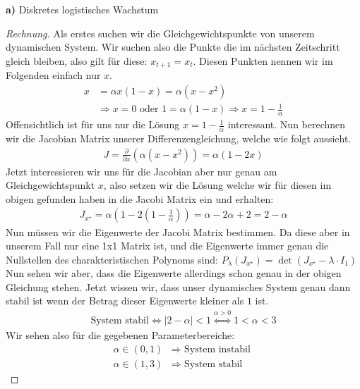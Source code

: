 \documentclass[a4paper]{article}
\newenvironment{Aufgabe}[2][Aufgabe]{\begin{trivlist}
\item[\hskip \labelsep {\bfseries #1}\hskip \labelsep {\bfseries #2.}]}{\end{trivlist}}
\begin{document}
	\begin{theorem} %
	\begin{Aufgabe}{20} %
		\textbf{a)} 
		Diskretes logistisches Wachstum
	\end{Aufgabe}

	\begin{proof}[Rechnung]
		Als erstes suchen wir die Gleichgewichtspunkte von unserem dynamischen System.
		Wir suchen also die Punkte die im nächsten Zeitschritt gleich bleiben, also gilt für diese:
		$x_{t+1} = x_{t}$. Diesen Punkten nennen wir im Folgenden einfach nur $x$.
		\begin{align*}
			x &= \alpha x (1 - x)
			= \alpha \left(
				x - x ^2
			\right) \\
			  & \Rightarrow x = 0 \text{ oder } 1 = \alpha ( 1 - x )
			  \Rightarrow x = 1 - \frac{ 1 }{ \alpha }
		\end{align*}
		Offensichtlich ist für uns nur die Lösung $x = 1 - \frac{ 1 }{ \alpha }$ interessant.
		Nun berechnen wir die Jacobian Matrix unserer Differenzengleichung, welche wie folgt aussieht.
		\begin{align*}
			J = \frac{ \partial  }{ \partial x } \left(
				\alpha (x - x ^2)
			\right) = \alpha \left(
				1 - 2 x
			\right) 
		\end{align*}
		Jetzt interessieren wir uns für die Jacobian aber nur genau am Gleichgewichtspunkt $x$, also setzen wir
		die Lösung welche wir für diesen im obigen gefunden haben in die Jacobi Matrix ein und erhalten:
		\begin{align*}
			J_{x ^{\star}} = \alpha \left(
				1 - 2 \left(
					1 - \frac{ 1 }{ \alpha }
				\right) 
			\right) = \alpha - 2 \alpha + 2 = 2 - \alpha
		\end{align*}
		Nun müssen wir die Eigenwerte der Jacobi Matrix bestimmen. Da diese aber in unserem Fall nur eine 1x1 Matrix
		ist, und die Eigenwerte immer genau die Nullstellen des charakteristischen Polynoms sind:
		$P_\lambda (J_{x ^{\star}}) = \det (J_{x ^{\star}} - \lambda \cdot I_1)$
		Nun sehen wir aber, dass die Eigenwerte allerdings schon genau in der obigen Gleichung stehen.
		Jetzt wissen wir, dass unser dynamisches System genau dann stabil ist wenn der Betrag dieser Eigenwerte
		kleiner als $1$ ist.
		\begin{align*}
			\text{System stabil} \Leftrightarrow
			| 2 - \alpha | < 1
			\overset{\alpha > 0} \Longleftrightarrow 1 < \alpha < 3
		\end{align*}
		Wir sehen also für die gegebenen Parameterbereiche:
		\begin{align*}
			\alpha \in (0, 1) & \Rightarrow \text{ System instabil } \\
			\alpha \in (1, 3) & \Rightarrow \text{ System stabil }
		\end{align*}
	\end{proof}
	\end{theorem}
\end{document}

